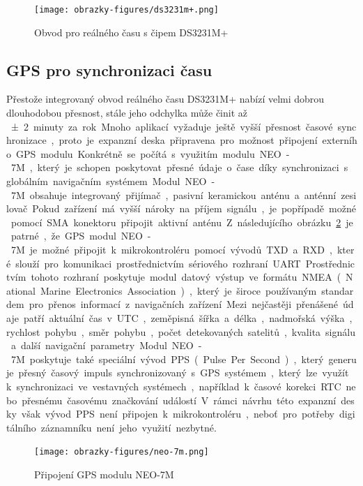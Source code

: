 \begin{figure}[h]
    \centering
    \texttt{[image: obrazky-figures/ds3231m+.png]}
    
    \caption{Obvod pro reálného času s čipem DS3231M+}
    \label{fig:ds3231m+}
\end{figure}

\subsection{GPS pro synchronizaci času}
Přestože integrovaný obvod reálného času DS3231M+ nabízí velmi dobrou dlouhodobou přesnost, stále jeho odchylka může činit až \SI{\pm2} minuty za rok. Mnoho aplikací vyžaduje ještě vyšší přesnost časové synchronizace, proto je expanzní deska připravena pro možnost připojení externího GPS modulu. Konkrétně se počítá s využitím modulu NEO-7M, který je schopen poskytovat přesné údaje o čase díky synchronizaci s globálním navigačním systémem.

Modul NEO-7M obsahuje integrovaný přijímač, pasivní keramickou anténu a anténní zesilovač. Pokud zařízení má vyšší nároky na příjem signálu, je popřípadě možné pomocí SMA konektoru připojit aktivní anténu. Z následujícího obrázku~\ref{fig:neo-7m} je patrné, že GPS modul NEO-7M je možné připojit k mikrokontroléru pomocí vývodů TXD a RXD, které slouží pro komunikaci prostřednictvím sériového rozhraní UART. Prostřednictvím tohoto rozhraní poskytuje modul datový výstup ve formátu NMEA (National Marine Electronics Association), který je široce používaným standardem pro přenos informací z navigačních zařízení. Mezi nejčastěji přenášené údaje patří aktuální čas v UTC, zeměpisná šířka a délka, nadmořská výška, rychlost pohybu, směr pohybu, počet detekovaných satelitů, kvalita signálu a další navigační parametry. Modul NEO-7M poskytuje také speciální vývod PPS (Pulse Per Second), který generuje přesný časový impuls synchronizovaný s GPS systémem, který lze využít k synchronizaci ve vestavných systémech, například k časové korekci RTC nebo přesnému časovému značkování událostí. V rámci návrhu této expanzní desky však vývod PPS není připojen k mikrokontroléru, neboť pro potřeby digitálního záznamníku není jeho využití nezbytné.

\begin{figure}[h]
    \centering
    \texttt{[image: obrazky-figures/neo-7m.png]}
    
    \caption{Připojení GPS modulu NEO-7M}
    \label{fig:neo-7m}
\end{figure}

